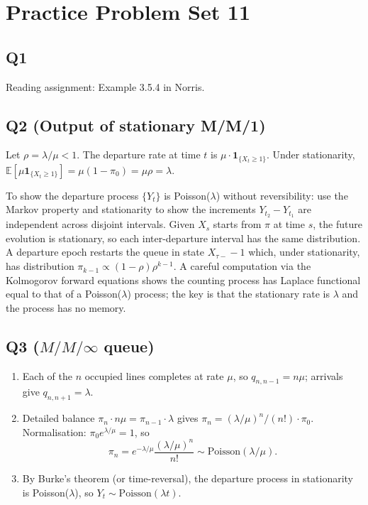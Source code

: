 \documentclass[11pt]{article}
\newcommand{\EE}{\mathbb{E}}
\newcommand{\1}{\mathbf{1}}
\begin{document}
\section{Practice Problem Set 11}

\subsection*{Q1}
Reading assignment: Example 3.5.4 in Norris.

\subsection*{Q2 (Output of stationary M/M/1)}
Let $\rho=\lambda/\mu<1$.  The departure rate at time $t$ is $\mu\cdot\1_{\{X_t\ge1\}}$.  Under stationarity, $\EE[\mu\1_{\{X_t\ge1\}}]=\mu(1-\pi_0)=\mu\rho=\lambda$.

To show the departure process $\{Y_t\}$ is Poisson($\lambda$) without reversibility: use the Markov property and stationarity to show the increments $Y_{t_2}-Y_{t_1}$ are independent across disjoint intervals.  Given $X_s$ starts from $\pi$ at time $s$, the future evolution is stationary, so each inter-departure interval has the same distribution.  A departure epoch restarts the queue in state $X_{\tau-}-1$ which, under stationarity, has distribution $\pi_{k-1}\propto(1-\rho)\rho^{k-1}$.  A careful computation via the Kolmogorov forward equations shows the counting process has Laplace functional equal to that of a Poisson($\lambda$) process; the key is that the stationary rate is $\lambda$ and the process has no memory.

\subsection*{Q3 ($M/M/\infty$ queue)}
\begin{enumerate}[label=(\alph*)]
\item Each of the $n$ occupied lines completes at rate $\mu$, so $q_{n,n-1}=n\mu$; arrivals give $q_{n,n+1}=\lambda$.
\item Detailed balance $\pi_n\cdot n\mu=\pi_{n-1}\cdot\lambda$ gives $\pi_n=(\lambda/\mu)^n/(n!)\cdot\pi_0$.  Normalisation: $\pi_0 e^{\lambda/\mu}=1$, so
\[
\pi_n=e^{-\lambda/\mu}\frac{(\lambda/\mu)^n}{n!}\sim\mathrm{Poisson}(\lambda/\mu).
\]
\item By Burke's theorem (or time-reversal), the departure process in stationarity is Poisson($\lambda$), so $Y_t\sim\mathrm{Poisson}(\lambda t)$.
\end{enumerate}
\end{document}
